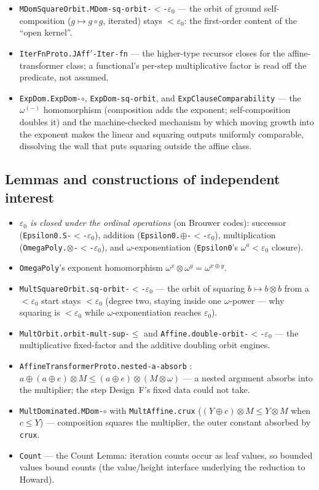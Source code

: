 \documentclass[11pt]{article}
\newcommand{\eps}{\varepsilon_0}
\newcommand{\code}[1]{\texttt{#1}}
\theoremstyle{definition}
\begin{document}
\begin{itemize}
\item \code{MDomSquareOrbit.MDom-sq-orbit-$<$-$\eps$} --- the orbit of ground
  self-composition ($g\mapsto g\circ g$, iterated) stays $<\eps$: the first-order
  content of the ``open kernel''.
\item \code{IterFnProto.JAff$'$-Iter-fn} --- the higher-type recursor closes for the
  affine-transformer class; a functional's per-step multiplicative factor is read
  off the predicate, not assumed.
\item \code{ExpDom.ExpDom-$\circ$}, \code{ExpDom-sq-orbit}, and
  \code{ExpClauseComparability} --- the $\omega^{(-)}$ homomorphism (composition adds the
  exponent; self-composition doubles it) and the machine-checked mechanism by which
  moving growth into the exponent makes the linear and squaring outputs uniformly
  comparable, dissolving the wall that puts squaring outside the affine class.
\end{itemize}

\subsection{Lemmas and constructions of independent interest}

\begin{itemize}
\item \emph{$\eps$ is closed under the ordinal operations} (on Brouwer codes):
  successor (\code{Epsilon0.S-$<$-$\eps$}), addition (\code{Epsilon0.$\oplus$-$<$-$\eps$}),
  multiplication (\code{OmegaPoly.$\otimes$-$<$-$\eps$}), and $\omega$-exponentiation
  (\code{Epsilon0}'s $\omega^{a}<\eps$ closure).
\item \code{OmegaPoly}'s exponent homomorphism $\omega^{x}\otimes\omega^{y}=
  \omega^{x\oplus y}$.
\item \code{MultSquareOrbit.sq-orbit-$<$-$\eps$} --- the orbit of squaring
  $b\mapsto b\otimes b$ from a $<\eps$ start stays $<\eps$ (degree two, staying
  inside one $\omega$-power --- why squaring is $<\eps$ while $\omega$-exponentiation
  reaches $\eps$).
\item \code{MultOrbit.orbit-mult-sup-$\le$} and \code{Affine.double-orbit-$<$-$\eps$}
  --- the multiplicative fixed-factor and the additive doubling orbit engines.
\item \code{AffineTransformerProto.nested-a-absorb} : $a\oplus(a\oplus e)\otimes M
  \le (a\oplus e)\otimes(M\otimes\omega)$ --- a nested argument absorbs into the
  multiplier; the step Design~F's fixed data could not take.
\item \code{MultDominated.MDom-$\circ$} with \code{MultAffine.crux}
  ($(Y\oplus c)\otimes M\le Y\otimes M$ when $c\le Y$) --- composition squares the
  multiplier, the outer constant absorbed by \code{crux}.
\item \code{Count} --- the Count Lemma: iteration counts occur as leaf values, so
  bounded values bound counts (the value/height interface underlying the reduction
  to Howard).
\end{itemize}
\end{document}
